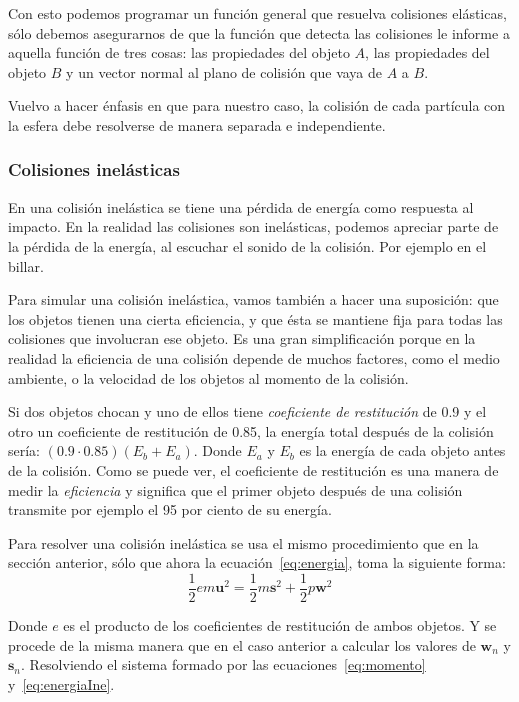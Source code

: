 Con esto podemos programar un función general que resuelva colisiones elásticas, sólo debemos asegurarnos de que la función que detecta las colisiones le informe a aquella función de tres cosas: las propiedades del objeto $A$, las propiedades del objeto $B$ y un vector normal al plano de colisión que vaya de $A$ a $B$.

Vuelvo a hacer énfasis en que para nuestro caso, la colisión de cada partícula con la esfera debe resolverse de manera separada e independiente.

\subsubsection{Colisiones inelásticas}
En una colisión inelástica se tiene una pérdida de energía como respuesta al impacto.
En la realidad las colisiones son inelásticas, podemos apreciar parte de la pérdida de la energía, al escuchar el sonido de la colisión.
Por ejemplo en el billar.

Para simular una colisión inelástica, vamos también a hacer una suposición: que los objetos tienen una cierta eficiencia, y que ésta se mantiene fija para todas las colisiones que involucran ese objeto.
Es una gran simplificación porque en la realidad la eficiencia de una colisión depende de muchos factores, como el medio ambiente, o la velocidad de los objetos al momento de la colisión.

Si dos objetos chocan y uno de ellos tiene \emph{coeficiente de restitución} de 0.9 y el otro un coeficiente de restitución de 0.85, la energía total después de la colisión sería: $\left( \text{0.9} \cdot \text{0.85} \right) \left(  E_b + E_a \right)$.
Donde $E_a$ y $E_b$ es la energía de cada objeto antes de la colisión.
Como se puede ver, el coeficiente de restitución es una manera de medir la \emph{eficiencia} y significa que el primer objeto después de una colisión transmite por ejemplo el 95 por ciento de su energía.

Para resolver una colisión inelástica se usa el mismo procedimiento que en la sección anterior, sólo que ahora la ecuación~\eqref{eq:energia}, toma la siguiente forma:
\begin{equation}
 \frac{1}{2} e m \textbf{u}^2 = \frac{1}{2} m \textbf{s}^2 + \frac{1}{2} p \textbf{w}^2
 \label{eq:energiaIne} 
\end{equation} 

Donde $e$ es el producto de los coeficientes de restitución de ambos objetos. Y se procede de la misma manera que en el caso anterior a calcular los valores de $\textbf{w}_n$ y $\textbf{s}_n$. Resolviendo el sistema formado por las ecuaciones~\eqref{eq:momento} y~\eqref{eq:energiaIne}.


